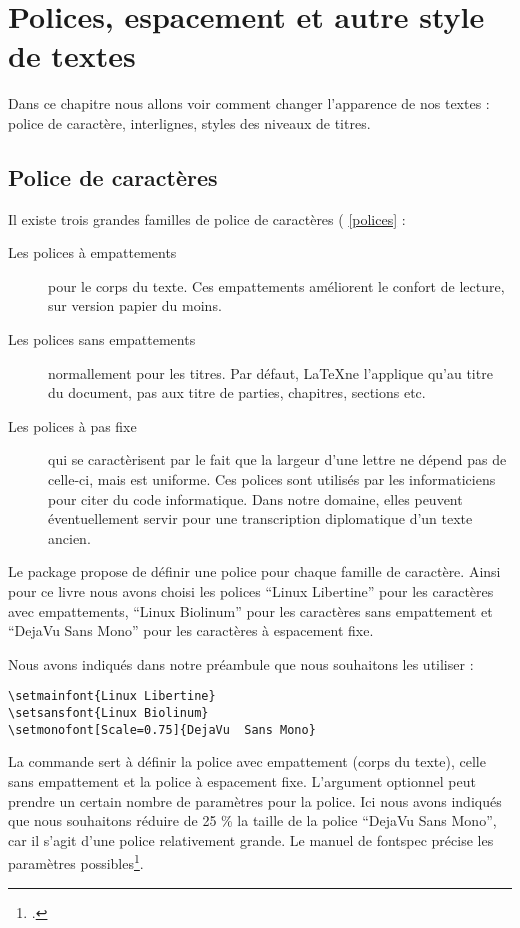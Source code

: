 \chapter{Polices, espacement et autre style de textes}


\begin{prealable}
Dans ce chapitre nous allons voir comment changer l'apparence de nos textes : police de caractère, interlignes, styles des niveaux de titres.  
\end{prealable}

\section{Police de caractères}

Il existe trois grandes familles de police de caractères  (\cf{} \ref{polices} : 
\begin{description}
\item[Les polices à empattements]pour le corps du texte. Ces empattements améliorent le confort de lecture, sur version papier du moins. 
\item[Les polices sans empattements]normallement pour les titres. Par défaut, \LaTeX ne l'applique qu'au titre du document, pas aux titre de parties, chapitres, sections etc.
\item[Les polices à pas fixe]qui se caractèrisent par le fait que la largeur d'une lettre ne dépend pas de celle-ci, mais est uniforme. Ces polices sont utilisés par les informaticiens pour citer du code informatique. Dans notre domaine, elles peuvent éventuellement servir pour une transcription diplomatique d'un texte ancien.
\end{description}

Le package  propose de définir une police pour chaque famille de caractère. Ainsi pour ce livre nous avons choisi les polices \enquote{Linux Libertine} pour les caractères avec empattements, \enquote{Linux Biolinum} pour les caractères sans empattement et \enquote{DejaVu  Sans Mono} pour les caractères à espacement fixe.

Nous avons indiqués dans notre préambule que nous souhaitons les utiliser :

\begin{verbatim}
\setmainfont{Linux Libertine}
\setsansfont{Linux Biolinum}
\setmonofont[Scale=0.75]{DejaVu  Sans Mono}
\end{verbatim}

La commande  sert à définir la police avec empattement (corps du texte),  celle sans empattement et  la police à espacement fixe. L'argument optionnel peut prendre un certain nombre de paramètres pour la police. Ici nous avons indiqués que nous souhaitons réduire de 25 \% la taille de la police \enquote{DejaVu Sans Mono}, car il s'agit d'une police relativement grande. Le manuel de fontspec précise les paramètres possibles\footcite{fontspec_optionspolices}.

